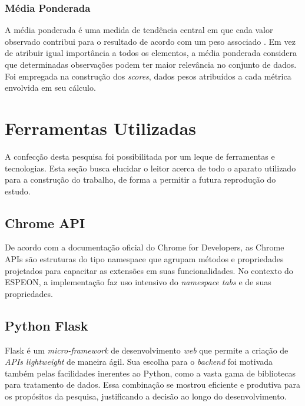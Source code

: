 \subsubsection{Média Ponderada}
A média ponderada é uma medida de tendência central em que cada valor observado contribui para o resultado de acordo com um peso associado \cite{da1970dicionario}. Em vez de atribuir igual importância a todos os elementos, a média ponderada considera que determinadas observações podem ter maior relevância no conjunto de dados. Foi empregada na construção dos \textit{scores}, dados pesos atribuídos a cada métrica envolvida em seu cálculo.


\section{Ferramentas Utilizadas}\label{sec:tools}
A confecção desta pesquisa foi possibilitada por um leque de ferramentas e tecnologias. Esta seção busca elucidar o leitor acerca de todo o aparato utilizado para a construção do trabalho, de forma a permitir a futura reprodução do estudo.

\subsection{Chrome API}\label{sub:tools_chrome_api}
De acordo com a documentação oficial do Chrome for Developers, as Chrome APIs são estruturas do tipo namespace que agrupam métodos e propriedades projetados para capacitar as extensões em suas funcionalidades. No contexto do ESPEON, a implementação faz uso intensivo do \textit{namespace tabs}  e de suas propriedades.

\subsection{Python Flask}\label{sub:tools_flask}
Flask é um \textit{micro-framework} de desenvolvimento \textit{web} que permite a criação de \textit{APIs lightweight} de maneira ágil. Sua escolha para o \textit{backend} foi motivada também pelas facilidades inerentes ao Python, como a vasta gama de bibliotecas para tratamento de dados. Essa combinação se mostrou eficiente e produtiva para os propósitos da pesquisa, justificando a decisão ao longo do desenvolvimento.

